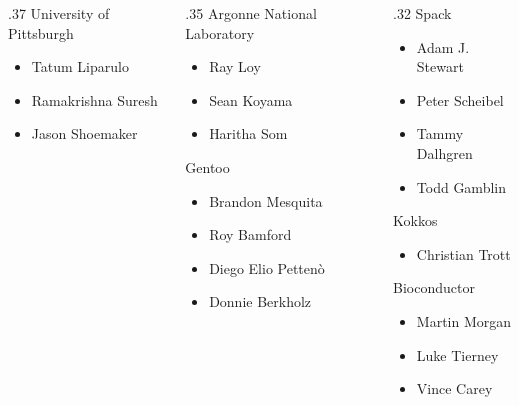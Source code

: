 \documentclass[
aspectratio=169,
xcolor={usenames}
]{beamer}
\begin{document}
{\begin{frame}
\begin{columns}[T]
\begin{column}{.37\framewidth}
      University of Pittsburgh
      \begin{itemize}
      \item Tatum Liparulo
      \item Ramakrishna Suresh
      \item Jason Shoemaker
      \end{itemize}
    \end{column}
    \begin{column}{.35\framewidth}
      \vspace{3.5\baselineskip}
      Argonne National Laboratory
      \begin{itemize}
      \item Ray Loy
      \item Sean Koyama
      \item Haritha Som
      \end{itemize}
      Gentoo
      \begin{itemize}
      \item Brandon Mesquita
      \item Roy Bamford
      \item Diego Elio Petten\`o
      \item Donnie Berkholz
      \end{itemize}
    \end{column}
    \begin{column}{.32\framewidth}
      Spack
      \begin{itemize}
      \item Adam J. Stewart
      \item Peter Scheibel
      \item Tammy Dalhgren
      \item Todd Gamblin
      \end{itemize}

      Kokkos
      \begin{itemize}
      \item Christian Trott
      \end{itemize}

      Bioconductor
      \begin{itemize}
      \item Martin Morgan
      \item Luke Tierney
      \item Vince Carey
      \end{itemize}
    \end{column}
  \end{columns}
\end{frame}
}
\end{document}
